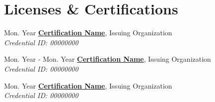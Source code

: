 \section{Licenses \& Certifications}

\begin{twocolentry}{Mon. Year}
    \textbf{\href{https://example.com/verify}{Certification Name}}, Issuing Organization \\
    \textit{Credential ID: 00000000}
\end{twocolentry}

\vspace{0.10cm}

\begin{twocolentry}{Mon. Year - Mon. Year}
    \textbf{\href{https://example.com/verify}{Certification Name}}, Issuing Organization \\
    \textit{Credential ID: 00000000}
\end{twocolentry}

\vspace{0.10cm}

\begin{twocolentry}{Mon. Year}
    \textbf{\href{https://example.com/verify}{Certification Name}}, Issuing Organization \\
    \textit{Credential ID: 00000000}
\end{twocolentry}
